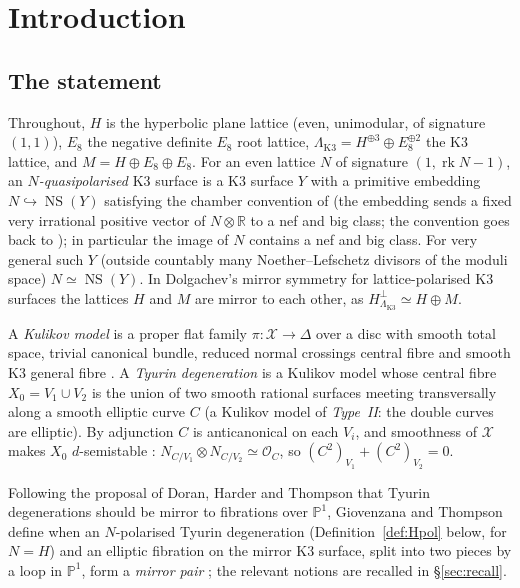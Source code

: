 \documentclass[11pt]{article}
\newcommand{\PP}{\mathbb P}
\newcommand{\NS}{\operatorname{NS}}
\newcommand{\rk}{\operatorname{rk}}
\newcommand{\calX}{\mathcal X}
\newcommand{\LK}{\Lambda_{\mathrm{K3}}}
\theoremstyle{definition}
\theoremstyle{remark}
\begin{document}
\section{Introduction}

\subsection{The statement}

Throughout, \(H\) is the hyperbolic plane lattice (even, unimodular,
of signature \((1,1)\)), \(E_8\) the negative definite \(E_8\) root
lattice, \(\LK=H^{\oplus3}\oplus E_8^{\oplus2}\) the K3 lattice, and
\(M=H\oplus E_8\oplus E_8\). For an even lattice \(N\) of signature
\((1,\rk N-1)\), an \emph{\(N\)-quasipolarised} K3 surface is a K3
surface \(Y\) with a primitive embedding \(N\hookrightarrow\NS(Y)\)
satisfying the chamber convention of \cite[Definition~3.19]{GT} (the
embedding sends a fixed very irrational positive vector of
\(N\otimes\mathbb R\) to a nef and big class; the convention goes back
to \cite{Do}); in particular the image of \(N\) contains a nef and big
class. For very general such \(Y\) (outside countably
many Noether--Lefschetz divisors of the moduli space)
\(N\simeq\NS(Y)\). In Dolgachev's mirror symmetry for
lattice-polarised K3 surfaces \cite{Do} the lattices \(H\) and \(M\)
are mirror to each other, as \(H^\perp_{\LK}\simeq H\oplus M\).

A \emph{Kulikov model} is a proper flat family
\(\pi\colon\calX\to\Delta\) over a disc with smooth total space,
trivial canonical bundle, reduced normal crossings central fibre and
smooth K3 general fibre \cite{Ku}. A \emph{Tyurin degeneration} is a
Kulikov model whose central fibre \(X_0=V_1\cup V_2\) is the union of
two smooth rational surfaces meeting transversally along a smooth
elliptic curve \(C\) (a Kulikov model of \emph{Type~II}: the double
curves are elliptic). By adjunction \(C\) is anticanonical on each
\(V_i\), and smoothness of \(\calX\) makes \(X_0\) \(d\)-semistable
\cite{Fr83}: \(N_{C/V_1}\otimes N_{C/V_2}\simeq\mathcal O_C\), so
\((C^2)_{V_1}+(C^2)_{V_2}=0\).

Following the proposal of Doran, Harder and Thompson \cite{DHT} that
Tyurin degenerations should be mirror to fibrations over \(\PP^1\),
Giovenzana and Thompson \cite{GT} define when an \(N\)-polarised
Tyurin degeneration (Definition~\ref{def:Hpol} below, for \(N=H\)) and
an elliptic fibration on the mirror K3 surface, split into two pieces
by a loop in \(\PP^1\), form a \emph{mirror pair}
\cite[Definition~5.1]{GT}; the relevant notions are recalled in
\S\ref{sec:recall}.
\end{document}
